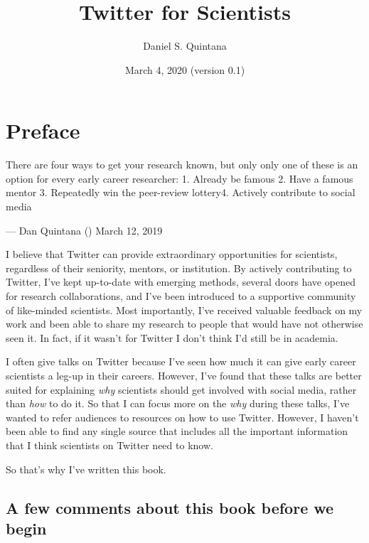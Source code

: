 \documentclass[]{book}
\title{Twitter for Scientists}
\author{Daniel S. Quintana}
\date{March 4, 2020 (version 0.1)}
\begin{document}
\maketitle

{
\setcounter{tocdepth}{1}
\tableofcontents
}
\hypertarget{preface}{%
\chapter*{Preface}\label{preface}}

There are four ways to get your research known, but only only one of these is an option for every early career researcher: 1. Already be famous 2. Have a famous mentor 3. Repeatedly win the peer-review lottery4. Actively contribute to social media

--- Dan Quintana (\citet{dsquintana}) March 12, 2019

I believe that Twitter can provide extraordinary opportunities for scientists, regardless of their seniority, mentors, or institution. By actively contributing to Twitter, I've kept up-to-date with emerging methods, several doors have opened for research collaborations, and I've been introduced to a supportive community of like-minded scientists. Most importantly, I've received valuable feedback on my work and been able to share my research to people that would have not otherwise seen it. In fact, if it wasn't for Twitter I don't think I'd still be in academia.

I often give talks on Twitter because I've seen how much it can give early career scientists a leg-up in their careers. However, I've found that these talks are better suited for explaining \emph{why} scientists should get involved with social media, rather than \emph{how} to do it. So that I can focus more on the \emph{why} during these talks, I've wanted to refer audiences to resources on how to use Twitter. However, I haven't been able to find any single source that includes all the important information that I think scientists on Twitter need to know.

So that's why I've written this book.

\hypertarget{a-few-comments-about-this-book-before-we-begin}{%
\section*{A few comments about this book before we begin}\label{a-few-comments-about-this-book-before-we-begin}}
\end{document}
